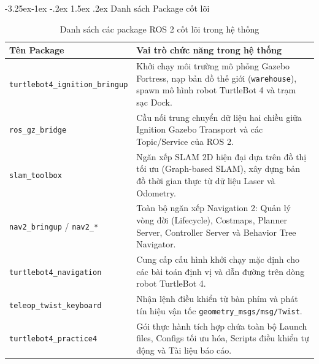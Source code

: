 \documentclass[11pt,a4paper]{article}
\makeatletter
\renewcommand{\subsection}{\@startsection{subsection}{2}{\z@}%
  {-3.25ex\@plus -1ex \@minus -.2ex}%
  {1.5ex \@plus .2ex}%
  {\normalfont\large\bfseries\color{secondary}}}
\makeatother
\begin{document}
\subsection{Danh sách Package cốt lõi}
\begin{table}[H]
\centering
\small
\begin{tabularx}{\textwidth}{p{4.2cm}X}
\toprule
\textbf{\color{primary}Tên Package} & \textbf{\color{primary}Vai trò chức năng trong hệ thống} \\
\midrule
\texttt{turtlebot4\_ignition\_bringup} & Khởi chạy môi trường mô phỏng Gazebo Fortress, nạp bản đồ thế giới (\texttt{warehouse}), spawn mô hình robot TurtleBot 4 và trạm sạc Dock. \\
\rowcolor{boxbg}
\texttt{ros\_gz\_bridge} & Cầu nối trung chuyển dữ liệu hai chiều giữa Ignition Gazebo Transport và các Topic/Service của ROS 2. \\
\texttt{slam\_toolbox} & Ngăn xếp SLAM 2D hiện đại dựa trên đồ thị tối ưu (Graph-based SLAM), xây dựng bản đồ thời gian thực từ dữ liệu Laser và Odometry. \\
\rowcolor{boxbg}
\texttt{nav2\_bringup} / \texttt{nav2\_*} & Toàn bộ ngăn xếp Navigation 2: Quản lý vòng đời (Lifecycle), Costmaps, Planner Server, Controller Server và Behavior Tree Navigator. \\
\texttt{turtlebot4\_navigation} & Cung cấp cấu hình khởi chạy mặc định cho các bài toán định vị và dẫn đường trên dòng robot TurtleBot 4. \\
\rowcolor{boxbg}
\texttt{teleop\_twist\_keyboard} & Nhận lệnh điều khiển từ bàn phím và phát tín hiệu vận tốc \texttt{geometry\_msgs/msg/Twist}. \\
\texttt{turtlebot4\_practice4} & Gói thực hành tích hợp chứa toàn bộ Launch files, Configs tối ưu hóa, Scripts điều khiển tự động và Tài liệu báo cáo. \\
\bottomrule
\end{tabularx}
\caption{Danh sách các package ROS 2 cốt lõi trong hệ thống}
\label{tab:packages}
\end{table}
\end{document}
